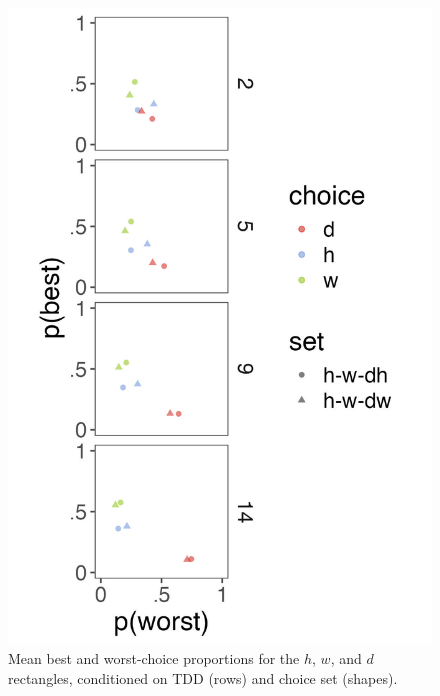\begin{figure}
   \includegraphics[width=\linewidth]{figures/crit_mean_choice_by_set_dist_labelHW.jpeg}
   \caption{Mean best and worst-choice proportions for the $h$, $w$, and $d$ rectangles, conditioned on TDD (rows) and choice set (shapes).}
   \label{fig:bw_mean_choice_by_set}
 \end{figure}

